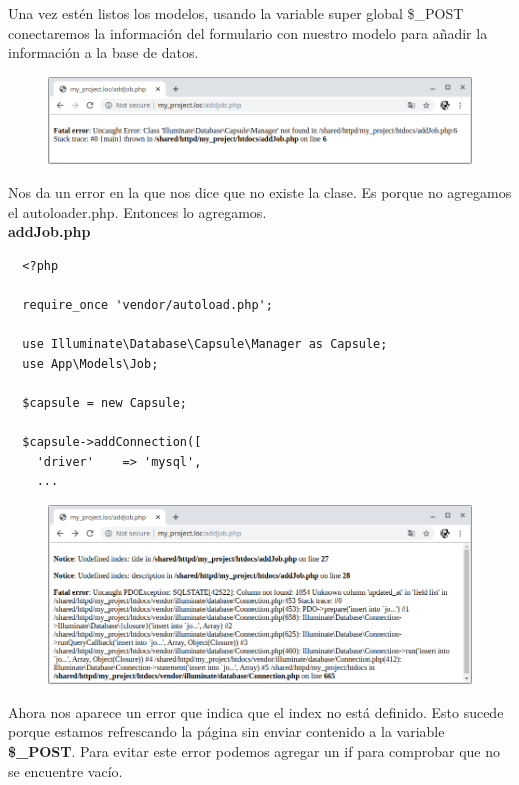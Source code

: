 \documentclass{article}
\begin{document}
Una vez estén listos los modelos, usando la variable super global \$\_POST
conectaremos la información del formulario con nuestro modelo para añadir la
información a la base de datos.\\

\begin{figure}[h!]
  \centering
  \includegraphics[scale=0.5]{./Pictures/075_eloquent_error.png}
\end{figure}

Nos da un error en la que nos dice que no existe la clase. Es porque no
agregamos el autoloader.php. Entonces lo agregamos.\\

\textbf{addJob.php}
\begin{verbatim}
  <?php

  require_once 'vendor/autoload.php';

  use Illuminate\Database\Capsule\Manager as Capsule;
  use App\Models\Job;

  $capsule = new Capsule;

  $capsule->addConnection([
    'driver'    => 'mysql',
    ...
\end{verbatim}

\begin{figure}[h!]
  \centering
  \includegraphics[scale=0.5]{./Pictures/076_eloquent_error.png}
\end{figure}

\newpage

Ahora nos aparece un error que indica que el index no está definido. Esto
sucede porque estamos refrescando la página sin enviar contenido a la variable
\textbf{\$\_POST}. Para evitar este error podemos agregar un if para comprobar
que no se encuentre vacío.\\
\end{document}
